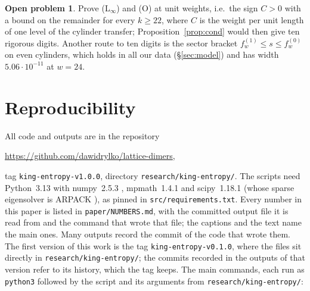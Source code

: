 \documentclass[11pt]{amsart}
\theoremstyle{definition}
\newtheorem{problem}[theorem]{Open problem}
\theoremstyle{remark}
\newcommand{\file}[1]{\texttt{#1}}
\begin{document}
\begin{problem}
Prove (L$_\infty$) and (O) at unit weights, i.e.\ the sign $C > 0$ with a bound on the remainder
for every $k \ge 22$, where $C$ is the weight per unit length of one level of the cylinder transfer; Proposition~\ref{prop:cond} would then give ten rigorous digits. Another
route to ten digits is the sector bracket $f^{(1)}_w \le s \le f^{(0)}_w$ on even cylinders, which
holds in all our data (\S\ref{sec:model}) and has width $5.06\cdot10^{-11}$ at $w = 24$.
\end{problem}

\section{Reproducibility}\label{sec:repro}
All code and outputs are in the repository
\begin{center}
\url{https://github.com/dawidrylko/lattice-dimers},
\end{center}
tag \texttt{king-entropy-v1.0.0}, directory \texttt{research/king-entropy/}. The scripts need
Python~3.13 with numpy~2.5.3 \cite{numpy2020}, mpmath~1.4.1 \cite{mpmath} and scipy~1.18.1
\cite{scipy2020} (whose sparse eigensolver is ARPACK \cite{arpack1998}), as pinned in
\file{src/requirements.txt}. Every number in this paper is listed in \file{paper/NUMBERS.md},
with the committed output file it is read from and the command that wrote that file; the captions
and the text name the main ones. Many outputs record the commit of the code that wrote them. The
first version of this work is the tag \texttt{king-entropy-v0.1.0}, where the files sit directly in
\texttt{research/king-entropy/}; the commits recorded in the outputs of that version refer to its
history, which the tag keeps. The main commands, each run as \texttt{python3} followed by the script
and its arguments from \texttt{research/king-entropy/}:
\end{document}
